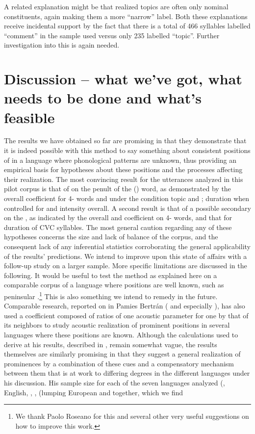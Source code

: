 \documentclass[output=paper]{LSP/langsci}
\begin{document}
A related explanation might be that realized topics are often only nominal constituents, again making them a more “narrow” label. Both these explanations receive incidental support by the fact that there is a total of 466 syllables labelled “comment” in the sample used versus only 235 labelled “topic”. Further investigation into this is again needed.
\\

\section{Discussion – what we’ve got, what needs to be done and what’s feasible}
The results we have obtained so far are promising in that they demonstrate that it is indeed possible with this method to say something about consistent positions of  in a language where phonological  patterns are unknown, thus providing an empirical basis for hypotheses about these positions and the processes affecting their realization. The most convincing result for the utterances analyzed in this pilot corpus is that of  on the penult of the () word, as demonstrated by the overall coefficient for 4- words and under the condition topic and ; duration when controlled for  and intensity overall. A second result is that of a possible secondary  on the , as indicated by the overall and  coefficient on 4- words, and that for duration of CVC syllables. The most general caution regarding any of these hypotheses concerns the size and lack of balance of the corpus, and the consequent lack of any inferential statistics corroborating the general applicability of the results’ predictions. We intend to improve upon this state of affairs with a follow-up study on a larger sample. More specific limitations are discussed in the following. It would be useful to test the method as explained here on a comparable corpus of a language where  positions are well known, such as peninsular .\footnote{We thank Paolo Roseano for this and several other very useful suggestions on how to improve this work.}  This is also something we intend to remedy in the future. Comparable research, reported on in Pamies Bertrán (\citeyear{PamiesBertran1994} and especially \citeyear{PamiesBertran1996}), has also used a coefficient composed of ratios of one acoustic parameter for one  by that of its neighbors to study acoustic realization of prominent positions in several languages where these positions are known. Although the calculations used to derive at his results, described in \citet[27--29]{PamiesBertran1996}, remain somewhat vague, the results themselves are similarly promising in that they suggest a general realization of prominences by a combination of these cues and a compensatory mechanism between them that is at work to differing degrees in the different languages under his discussion. His sample size for each of the seven languages analyzed (, English, , ,  (lumping European and  together, which we find 
\end{document}

